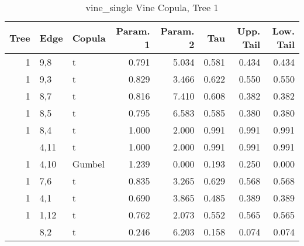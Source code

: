 \begin{table}

\caption{vine_single Vine Copula, Tree 1}
\centering
\begin{tabular}[t]{rllrrrrr}
\toprule
Tree & Edge & Copula & Param. 1 & Param. 2 & Tau & Upp. Tail & Low. Tail\\
\midrule
1 & 9,8 & t & 0.791 & 5.034 & 0.581 & 0.434 & 0.434\\
1 & 9,3 & t & 0.829 & 3.466 & 0.622 & 0.550 & 0.550\\
1 & 8,7 & t & 0.816 & 7.410 & 0.608 & 0.382 & 0.382\\
1 & 8,5 & t & 0.795 & 6.583 & 0.585 & 0.380 & 0.380\\
1 & 8,4 & t & 1.000 & 2.000 & 0.991 & 0.991 & 0.991\\
\addlinespace
1 & 4,11 & t & 1.000 & 2.000 & 0.991 & 0.991 & 0.991\\
1 & 4,10 & Gumbel & 1.239 & 0.000 & 0.193 & 0.250 & 0.000\\
1 & 7,6 & t & 0.835 & 3.265 & 0.629 & 0.568 & 0.568\\
1 & 4,1 & t & 0.690 & 3.865 & 0.485 & 0.389 & 0.389\\
1 & 1,12 & t & 0.762 & 2.073 & 0.552 & 0.565 & 0.565\\
\addlinespace
1 & 8,2 & t & 0.246 & 6.203 & 0.158 & 0.074 & 0.074\\
\bottomrule
\end{tabular}
\end{table}
